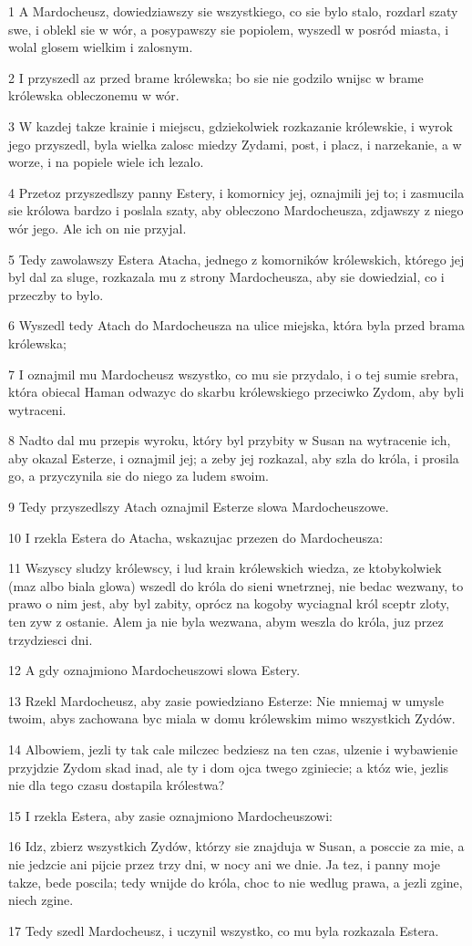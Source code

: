 \par 1 A Mardocheusz, dowiedziawszy sie wszystkiego, co sie bylo stalo, rozdarl szaty swe, i oblekl sie w wór, a posypawszy sie popiolem, wyszedl w posród miasta, i wolal glosem wielkim i zalosnym.
\par 2 I przyszedl az przed brame królewska; bo sie nie godzilo wnijsc w brame królewska obleczonemu w wór.
\par 3 W kazdej takze krainie i miejscu, gdziekolwiek rozkazanie królewskie, i wyrok jego przyszedl, byla wielka zalosc miedzy Zydami, post, i placz, i narzekanie, a w worze, i na popiele wiele ich lezalo.
\par 4 Przetoz przyszedlszy panny Estery, i komornicy jej, oznajmili jej to; i zasmucila sie królowa bardzo i poslala szaty, aby obleczono Mardocheusza, zdjawszy z niego wór jego. Ale ich on nie przyjal.
\par 5 Tedy zawolawszy Estera Atacha, jednego z komorników królewskich, którego jej byl dal za sluge, rozkazala mu z strony Mardocheusza, aby sie dowiedzial, co i przeczby to bylo.
\par 6 Wyszedl tedy Atach do Mardocheusza na ulice miejska, która byla przed brama królewska;
\par 7 I oznajmil mu Mardocheusz wszystko, co mu sie przydalo, i o tej sumie srebra, która obiecal Haman odwazyc do skarbu królewskiego przeciwko Zydom, aby byli wytraceni.
\par 8 Nadto dal mu przepis wyroku, który byl przybity w Susan na wytracenie ich, aby okazal Esterze, i oznajmil jej; a zeby jej rozkazal, aby szla do króla, i prosila go, a przyczynila sie do niego za ludem swoim.
\par 9 Tedy przyszedlszy Atach oznajmil Esterze slowa Mardocheuszowe.
\par 10 I rzekla Estera do Atacha, wskazujac przezen do Mardocheusza:
\par 11 Wszyscy sludzy królewscy, i lud krain królewskich wiedza, ze ktobykolwiek (maz albo biala glowa) wszedl do króla do sieni wnetrznej, nie bedac wezwany, to prawo o nim jest, aby byl zabity, oprócz na kogoby wyciagnal król sceptr zloty, ten zyw z ostanie. Alem ja nie byla wezwana, abym weszla do króla, juz przez trzydziesci dni.
\par 12 A gdy oznajmiono Mardocheuszowi slowa Estery.
\par 13 Rzekl Mardocheusz, aby zasie powiedziano Esterze: Nie mniemaj w umysle twoim, abys zachowana byc miala w domu królewskim mimo wszystkich Zydów.
\par 14 Albowiem, jezli ty tak cale milczec bedziesz na ten czas, ulzenie i wybawienie przyjdzie Zydom skad inad, ale ty i dom ojca twego zginiecie; a któz wie, jezlis nie dla tego czasu dostapila królestwa?
\par 15 I rzekla Estera, aby zasie oznajmiono Mardocheuszowi:
\par 16 Idz, zbierz wszystkich Zydów, którzy sie znajduja w Susan, a posccie za mie, a nie jedzcie ani pijcie przez trzy dni, w nocy ani we dnie. Ja tez, i panny moje takze, bede poscila; tedy wnijde do króla, choc to nie wedlug prawa, a jezli zgine, niech zgine.
\par 17 Tedy szedl Mardocheusz, i uczynil wszystko, co mu byla rozkazala Estera.

